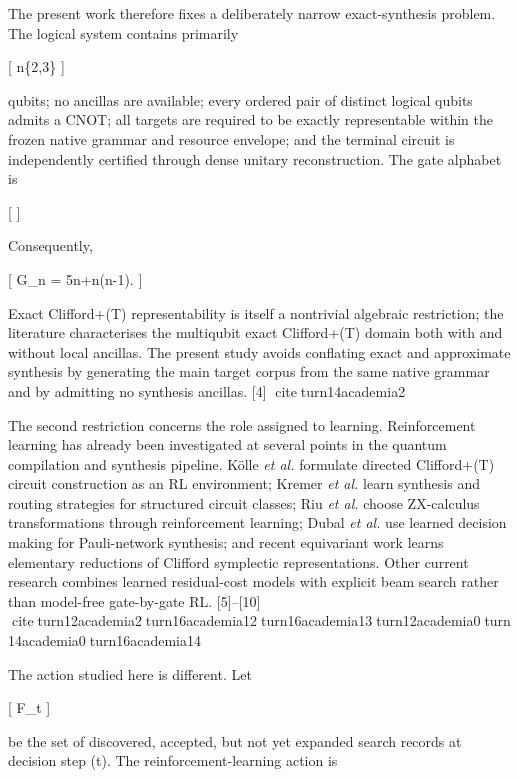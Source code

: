 \documentclass[
]{article}
\begin{document}
The present work therefore fixes a deliberately narrow exact-synthesis
problem. The logical system contains primarily

{[} n\in\{2,3\} {]}

qubits; no ancillas are available; every ordered pair of distinct
logical qubits admits a CNOT; all targets are required to be exactly
representable within the frozen native grammar and resource envelope;
and the terminal circuit is independently certified through dense
unitary reconstruction. The gate alphabet is

{[}   {]}

Consequently,

{[} \textbar{}\mathcal G\_n\textbar{} = 5n+n(n-1).  {]}

Exact Clifford+(T) representability is itself a nontrivial algebraic
restriction; the literature characterises the multiqubit exact
Clifford+(T) domain both with and without local ancillas. The present
study avoids conflating exact and approximate synthesis by generating
the main target corpus from the same native grammar and by admitting no
synthesis ancillas. {[}4{]} citeturn14academia2

The second restriction concerns the role assigned to learning.
Reinforcement learning has already been investigated at several points
in the quantum compilation and synthesis pipeline. Kölle \emph{et al.}
formulate directed Clifford+(T) circuit construction as an RL
environment; Kremer \emph{et al.} learn synthesis and routing strategies
for structured circuit classes; Riu \emph{et al.} choose ZX-calculus
transformations through reinforcement learning; Dubal \emph{et al.} use
learned decision making for Pauli-network synthesis; and recent
equivariant work learns elementary reductions of Clifford symplectic
representations. Other current research combines learned residual-cost
models with explicit beam search rather than model-free gate-by-gate RL.
{[}5{]}--{[}10{]}
citeturn12academia2turn16academia12turn16academia13turn12academia0turn14academia0turn16academia14

The action studied here is different. Let

{[} \mathcal F\_t {]}

be the set of discovered, accepted, but not yet expanded search records
at decision step (t). The reinforcement-learning action is
\end{document}
